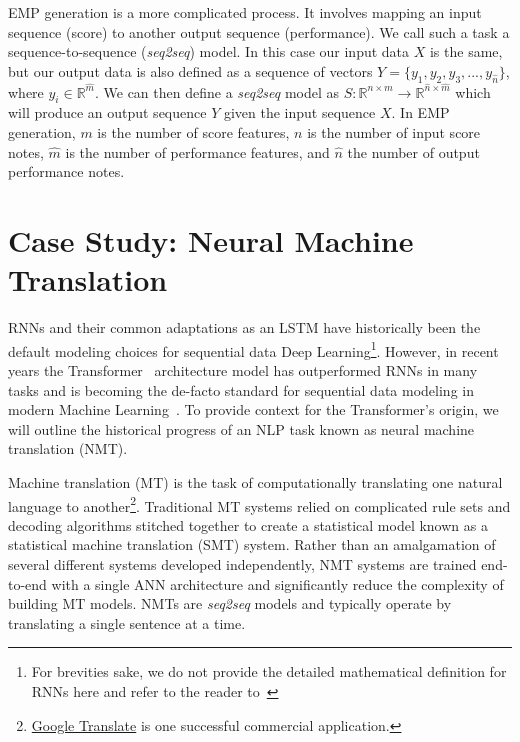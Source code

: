 \newcommand{\seq}{\emph{seq2seq}}

EMP generation is a more complicated process. It involves mapping an input sequence (score) to another output sequence (performance). We call such a task a sequence-to-sequence (\seq{}) model. In this case our input data $X$ is the same, but our output data is also defined as a sequence of vectors $Y = \{y_1, y_2, y_3, ..., y_{\hat{n}}\}$, where $y_i \in \mathbb{R}^{\hat{m}}$. We can then define a \seq{} model as $S: \mathbb{R}^{n \times m} \rightarrow \mathbb{R}^{\hat{n} \times \hat{m}}$ which will produce an output sequence $Y$ given the input sequence $X$. In EMP generation, $m$ is the number of score features, $n$ is the number of input score notes, $\hat{m}$ is the number of performance features, and $\hat{n}$ the number of output performance notes. 

\section{Case Study: Neural Machine Translation}
RNNs and their common adaptations as an LSTM have historically been the default modeling choices for sequential data Deep Learning\footnote{For brevities sake, we do not provide the detailed mathematical definition for RNNs here and refer to the reader to~\citet{goodfellow2016deep}}. However, in recent years the Transformer~\cite{vaswani2017attention} architecture model has outperformed RNNs in many tasks and is becoming the de-facto standard for sequential data modeling in modern Machine Learning~\cite{devlin2018bert, brown2020language}. To provide context for the Transformer's origin, we will outline the historical progress of an NLP task known as neural machine translation (NMT). 

Machine translation (MT) is the task of computationally translating one natural language to another\footnote{\href{https://translate.google.com/}{Google Translate} is one successful commercial application.}. Traditional MT systems relied on complicated rule sets and decoding algorithms stitched together to create a statistical model known as a statistical machine translation (SMT) system. Rather than an amalgamation of several different systems developed independently, NMT systems are trained end-to-end with a single ANN architecture and significantly reduce the complexity of building MT models. NMTs are \seq{} models and typically operate by translating a single sentence at a time.

